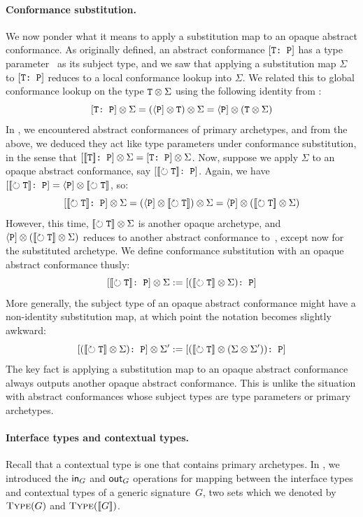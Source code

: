 \documentclass[../generics]{subfiles}
\begin{document}
\paragraph{Conformance substitution.}
We now ponder what it means to apply a substitution map to an opaque abstract conformance. As originally defined, an abstract conformance $[\texttt{T:~P}]$ has a type parameter \tT\ as its subject type, and we saw that applying a substitution map $\Sigma$ to $[\texttt{T:~P}]$ reduces to a local conformance lookup into $\Sigma$. We related this to global conformance lookup on the type $\texttt{T} \otimes \Sigma$ using the following identity from :
\[
[\texttt{T:~P}] \otimes \Sigma = (\langle\texttt{P}] \otimes \texttt{T}) \otimes \Sigma = \langle\texttt{P}] \otimes (\texttt{T} \otimes \Sigma)
\]
In , we encountered abstract conformances of primary archetypes, and from the above, we deduced they act like type parameters under conformance substitution, in the sense that $[\texttt{$[\![\texttt{T}]\!]$:~P}] \otimes \Sigma = [\texttt{T:~P}] \otimes \Sigma$. Now, suppose we apply $\Sigma$ to an opaque abstract conformance, say $[\texttt{$[\![\circlearrowright \texttt{\texttt{T}}]\!]$:~P}]$. Again, we have $[\texttt{$[\![\circlearrowright \texttt{\texttt{T}}]\!]$:~P}] = \langle\texttt{P}] \otimes [\![\circlearrowright \texttt{\texttt{T}}]\!]$, so:
\[
[\texttt{$[\![\circlearrowright \texttt{\texttt{T}}]\!]$:~P}] \otimes \Sigma = (\langle\texttt{P}] \otimes [\![\circlearrowright \texttt{\texttt{T}}]\!]) \otimes \Sigma = \langle\texttt{P}] \otimes ([\![\circlearrowright \texttt{\texttt{T}}]\!] \otimes \Sigma)
\]
However, this time, $[\![\circlearrowright \texttt{\texttt{T}}]\!] \otimes \Sigma$ is another opaque archetype, and $\langle\texttt{P}] \otimes ([\![\circlearrowright \texttt{\texttt{T}}]\!] \otimes \Sigma)$ reduces to another abstract conformance to~\tP, except now for the substituted archetype. We define conformance substitution with an opaque abstract conformance thusly:
\[
[\texttt{$[\![\circlearrowright \texttt{\texttt{T}}]\!]$:~P}] \otimes \Sigma := [\texttt{$([\![\circlearrowright \texttt{\texttt{T}}]\!] \otimes \Sigma)$:~P}]
\]
More generally, the subject type of an opaque abstract conformance might have a non-identity substitution map, at which point the notation becomes slightly awkward:
\[
[\texttt{$([\![\circlearrowright \texttt{\texttt{T}}]\!] \otimes \Sigma)$:~P}] \otimes \Sigma' := [\texttt{$([\![\circlearrowright \texttt{\texttt{T}}]\!] \otimes (\Sigma \otimes \Sigma'))$:~P}]
\]
The key fact is applying a substitution map to an opaque abstract conformance always outputs another opaque abstract conformance. This is unlike the situation with abstract conformances whose subject types are type parameters or primary archetypes.

\paragraph{Interface types and contextual types.} Recall that a contextual type is one that contains primary archetypes. In , we introduced the $\mathsf{in}_G$ and $\mathsf{out}_G$ operations for mapping between the interface types and contextual types of a generic signature~$G$, two sets which we denoted by $\textsc{Type}({G})$ and $\textsc{Type}({[\![G]\!]})$.
\end{document}
